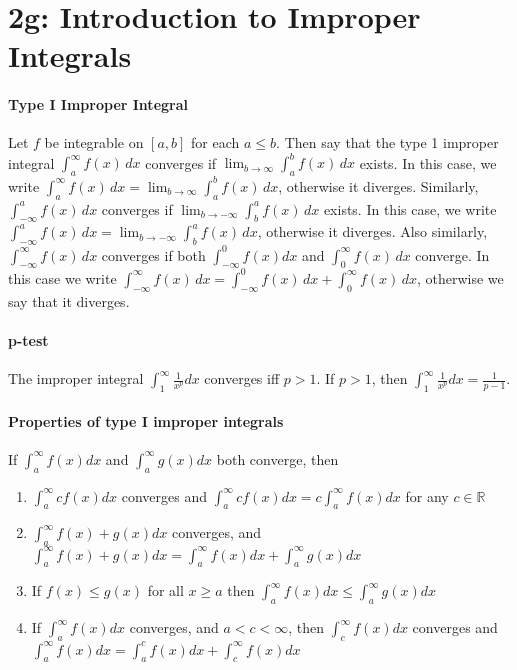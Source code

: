 \documentclass[10pt,letter]{article}
\begin{document}
\section*{2g: Introduction to Improper Integrals}
\paragraph{Type I Improper Integral}
Let $f$ be integrable on $[a,b]$ for each $a\leq b$. Then say that the type 1 improper integral $\int_a^\infty f(x)\,dx$ converges if $\lim_{b\rightarrow\infty}\int_a^bf(x)\,dx$ exists. In this case, we write $\int_a^\infty f(x)\,dx=\lim_{b\rightarrow\infty}\int_a^bf(x)\,dx$, otherwise it diverges. Similarly, $\int_{-\infty}^a f(x)\,dx$ converges if $\lim_{b\rightarrow-\infty}\int_b^af(x)\,dx$ exists. In this case, we write $\int_{-\infty}^a f(x)\,dx=\lim_{b\rightarrow-\infty}\int_b^af(x)\,dx$, otherwise it diverges. Also similarly, $\int_{-\infty}^\infty f(x)\,dx$ converges if both $\int_{-\infty}^0f(x)dx$ and $\int_0^\infty f(x)\,dx$ converge. In this case we write $\int_{-\infty}^\infty f(x)\,dx=\int_{-\infty}^0f(x)\,dx+\int_0^\infty f(x)\,dx$, otherwise we say that it diverges. 

\paragraph{p-test}
The improper integral $\int_1^\infty\frac{1}{x^p}dx$ converges iff $p>1$. If $p>1$, then $\int_1^\infty\frac{1}{x^p}dx=\frac{1}{p-1}$.

\paragraph{Properties of type I improper integrals} If $\int_a^\infty f(x)dx$ and $\int_a^\infty g(x)dx$ both converge, then \begin{enumerate}
    \item $\int_a^\infty cf(x)dx$ converges and $\int_a^\infty cf(x)dx=c\int_a^\infty f(x)dx$ for any $c\in\mathbb{R}$ 
    \item $\int_a^\infty f(x)+g(x)dx$ converges, and $\int_a^\infty f(x)+g(x)dx = \int_a^\infty f(x)dx + \int_a^\infty g(x)dx$ 
    \item If $f(x)\leq g(x)$ for all $x\geq a$ then $\int_a^\infty f(x)dx \leq \int_a^\infty g(x)dx$ 
    \item If $\int_a^\infty f(x)dx$ converges, and $a<c<\infty$, then $\int_c^\infty f(x)dx$ converges and $\int_a^\infty f(x)dx = \int_a^cf(x)dx + \int_c^\infty f(x)dx$
\end{enumerate}
\end{document}
